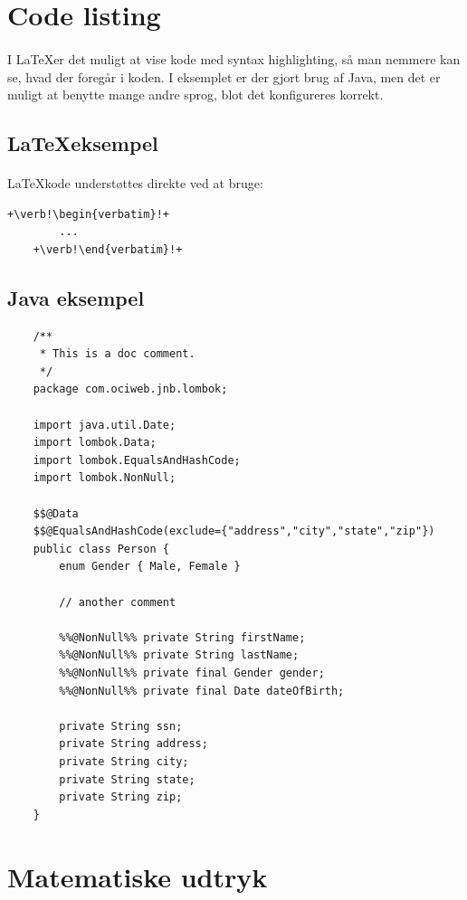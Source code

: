 \documentclass{article}
\begin{document}
\begin{enumerate}
\section{Code listing}
\paragraph{}
I \LaTeX er det muligt at vise kode med syntax highlighting, så man nemmere kan se, hvad der foregår i koden. I eksemplet er der gjort brug af Java, men det er muligt at benytte mange andre sprog, blot det konfigureres korrekt.
\subsection{\LaTeX eksempel}
\paragraph{}
\LaTeX kode understøttes direkte ved at bruge:
\begin{lstlisting}[escapechar=+]
    +\verb!\begin{verbatim}!+
        ...
    +\verb!\end{verbatim}!+
\end{lstlisting}
\subsection{Java eksempel}
\begin{lstlisting}
    /**
     * This is a doc comment.
     */
    package com.ociweb.jnb.lombok;
    
    import java.util.Date;
    import lombok.Data;
    import lombok.EqualsAndHashCode;
    import lombok.NonNull;
    
    $$@Data
    $$@EqualsAndHashCode(exclude={"address","city","state","zip"})
    public class Person {
        enum Gender { Male, Female }
    
        // another comment
    
        %%@NonNull%% private String firstName;
        %%@NonNull%% private String lastName;
        %%@NonNull%% private final Gender gender;
        %%@NonNull%% private final Date dateOfBirth;
    
        private String ssn;
        private String address;
        private String city;
        private String state;
        private String zip;
    }
    \end{lstlisting}
\section{Matematiske udtryk}

\end{enumerate}
\end{document}
